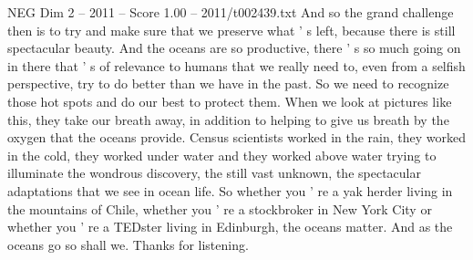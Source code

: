\begin{textsample}{NEG Dim 2 – 2011 – Score 1.00 – 2011/t002439.txt}
And so the grand challenge then is to try and make sure that we preserve what ' s left, because there is still spectacular beauty.
And the oceans are so productive, there ' s so much going on in there that ' s of relevance to humans that we really need to, even from a selfish perspective, try to do better than we have in the past.
So we need to recognize those hot spots and do our best to protect them.
When we look at pictures like this, they take our breath away, in addition to helping to give us breath by the oxygen that the oceans provide.
Census scientists worked in the rain, they worked in the cold, they worked under water and they worked above water trying to illuminate the wondrous discovery, the still vast unknown, the spectacular adaptations that we see in ocean life.
So whether you ' re a yak herder living in the mountains of Chile, whether you ' re a stockbroker in New York City or whether you ' re a TEDster living in Edinburgh, the oceans matter.
And as the oceans go so shall we.
Thanks for listening.

\end{textsample}
